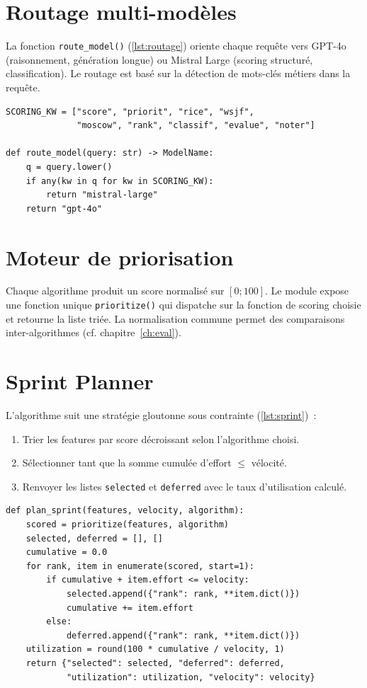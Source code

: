 \section{Routage multi-modèles}
La fonction \texttt{route\_model()} (\cref{lst:routage}) oriente
chaque requête vers GPT-4o (raisonnement, génération longue) ou
Mistral Large (scoring structuré, classification). Le routage est
basé sur la détection de mots-clés métiers dans la requête.

\begin{lstlisting}[caption={Routage multi-modèles simplifié.},label={lst:routage}]
SCORING_KW = ["score", "priorit", "rice", "wsjf",
              "moscow", "rank", "classif", "evalue", "noter"]

def route_model(query: str) -> ModelName:
    q = query.lower()
    if any(kw in q for kw in SCORING_KW):
        return "mistral-large"
    return "gpt-4o"
\end{lstlisting}

\section{Moteur de priorisation}
Chaque algorithme produit un score normalisé sur $[0;100]$. Le
module expose une fonction unique \texttt{prioritize()} qui
dispatche sur la fonction de scoring choisie et retourne la liste
triée. La normalisation commune permet des comparaisons
inter-algorithmes (cf. chapitre~\ref{ch:eval}).

\section{Sprint Planner}
L'algorithme suit une stratégie gloutonne sous contrainte
(\cref{lst:sprint})~:
\begin{enumerate}
  \item Trier les features par score décroissant selon
        l'algorithme choisi.
  \item Sélectionner tant que la somme cumulée d'effort
        $\leq$ vélocité.
  \item Renvoyer les listes \texttt{selected} et \texttt{deferred}
        avec le taux d'utilisation calculé.
\end{enumerate}

\begin{lstlisting}[caption={Algorithme glouton du Sprint Planner.},label={lst:sprint}]
def plan_sprint(features, velocity, algorithm):
    scored = prioritize(features, algorithm)
    selected, deferred = [], []
    cumulative = 0.0
    for rank, item in enumerate(scored, start=1):
        if cumulative + item.effort <= velocity:
            selected.append({"rank": rank, **item.dict()})
            cumulative += item.effort
        else:
            deferred.append({"rank": rank, **item.dict()})
    utilization = round(100 * cumulative / velocity, 1)
    return {"selected": selected, "deferred": deferred,
            "utilization": utilization, "velocity": velocity}
\end{lstlisting}

